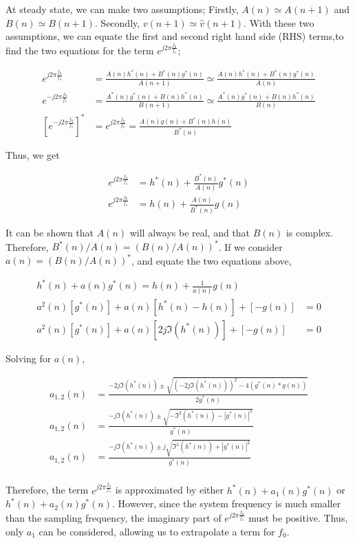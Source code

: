 \documentclass[main.tex]{subfiles}
\begin{document}
At steady state, we can make two assumptions; Firstly, $A(n) \simeq A(n+1)$ and $B(n) \simeq B(n+1)$. Secondly, $v(n+1) \simeq \hat{v}(n+1)$. With these two assumptions, we can equate the first and second right hand side (RHS) terms,to find the two equations for the term $e^{j2\pi\frac{f_0}{f_s}}$;

\begin{align*}
e^{j2\pi\frac{f_0}{f_s}} &= \frac{A(n)h^*(n) + B^*(n)g^*(n)}{A(n+1)} \simeq \frac{A(n)h^*(n) + B^*(n)g^*(n)}{A(n)} \\
e^{-j2\pi\frac{f_0}{f_s}} &= \frac{A^*(n)g^*(n) + B(n)h^*(n)}{B(n+1)} \simeq \frac{A^*(n)g^*(n) + B(n)h^*(n)}{B(n)}\\
\left[e^{-j2\pi\frac{f_0}{f_s}}\right]^* &= e^{j2\pi\frac{f_0}{f_s}} =  \frac{A(n)g(n) + B^*(n)h(n)}{B^*(n)}
\end{align*}

Thus, we get

\begin{align*}
e^{j2\pi\frac{f_0}{f_s}} &= h^*(n) + \frac{B^*(n)}{A(n)}g^*(n)\\
e^{j2\pi\frac{f_0}{f_s}} &= h(n) + \frac{A(n)}{B^*(n)}g(n)
\end{align*}

It can be shown that $A(n)$ will always be real, and that $B(n)$ is complex. Therefore, $B^*(n)/A(n) = \left(B(n)/A(n)\right)^*$. If we consider $a(n) = (B(n)/A(n))^*$, and equate the two equations above,

\begin{align*}
h^*(n) + a(n)g^*(n) = h(n) + \frac{1}{a(n)}g(n)\\
a^2(n)\left[g^*(n)\right] + a(n)\left[h^*(n) - h(n)\right] + \left[-g(n)\right] &= 0\\
a^2(n)\left[g^*(n)\right] + a(n)\left[2j\Im(h^*(n))\right] + \left[-g(n)\right] &= 0
\end{align*}

Solving for $a(n)$,

\begin{align*}
a_{1,2}(n) &= \frac{-2j\Im(h^*(n)) \pm \sqrt{ (-2j\Im(h^*(n)))^2 -4(g^*(n) * g(n)) } }{2g^*(n)}\\
a_{1,2}(n) &= \frac{-j\Im(h^*(n)) \pm \sqrt{ -\Im^2(h^*(n)) -|g^*(n)|^2 } }{g^*(n)}\\
a_{1,2}(n) &= \frac{-j\Im(h^*(n)) \pm j\sqrt{ \Im^2(h^*(n)) + |g^*(n)|^2 } }{g^*(n)}\\
\end{align*}

Therefore, the term $e^{j2\pi\frac{f_0}{f_s}}$ is approximated by either $h^*(n) + a_1(n)g^*(n)$ or $h^*(n) + a_2(n)g^*(n)$. However, since the system frequency is much smaller than the sampling frequency, the imaginary part of $e^{j2\pi\frac{f_0}{f_s}}$ must be positive. Thus, only $a_1$ can be considered, allowing us to extrapolate a term for $f_0$.
\end{document}
